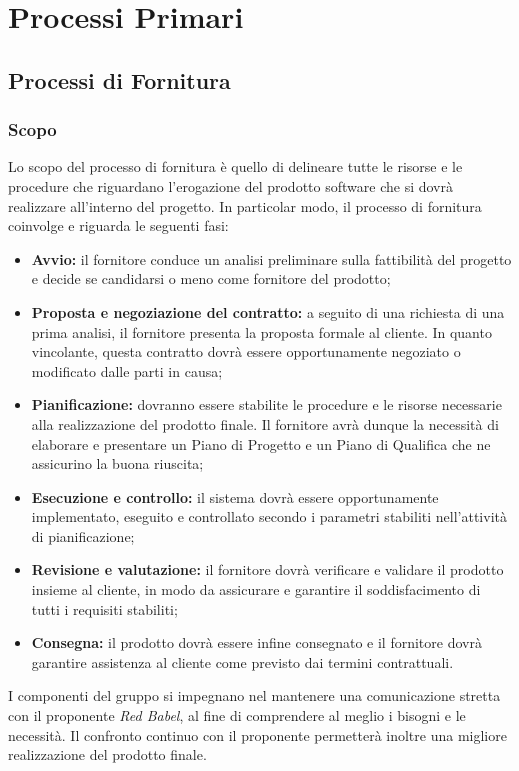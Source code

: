 \section{Processi Primari}
\subsection{Processi di Fornitura}
\subsubsection{Scopo}
Lo scopo del processo di fornitura è quello di delineare tutte le risorse e le procedure che riguardano l'erogazione del prodotto software che si dovrà realizzare all'interno del progetto. In particolar modo, il processo di fornitura coinvolge e riguarda le seguenti fasi:
\begin{itemize}
	\item \textbf{Avvio:} il fornitore conduce un analisi preliminare sulla fattibilità del progetto e decide se candidarsi o meno come fornitore del prodotto;
	\item \textbf{Proposta e negoziazione del contratto:} a seguito di una richiesta di una prima analisi, il fornitore presenta la proposta formale al cliente. In quanto vincolante, questa contratto dovrà essere opportunamente negoziato o modificato dalle parti in causa;
	\item \textbf{Pianificazione:} dovranno essere stabilite le procedure e le risorse necessarie alla realizzazione del prodotto finale. Il fornitore avrà dunque la necessità di elaborare e presentare un Piano di Progetto e un Piano di Qualifica che ne assicurino la buona riuscita;
	\item \textbf{Esecuzione e controllo:} il sistema dovrà essere opportunamente implementato, eseguito e controllato secondo i parametri stabiliti nell'attività di pianificazione;
	\item \textbf{Revisione e valutazione:} il fornitore dovrà verificare e validare il prodotto insieme al cliente, in modo da assicurare e garantire il soddisfacimento di tutti i requisiti stabiliti;
	\item \textbf{Consegna:} il prodotto dovrà essere infine consegnato e il fornitore dovrà garantire assistenza al cliente come previsto dai termini contrattuali.
\end{itemize} 
I componenti del gruppo si impegnano nel mantenere una comunicazione stretta con il proponente \textit{Red Babel}, al fine di comprendere al meglio i bisogni e le necessità. Il confronto continuo con il proponente permetterà inoltre una migliore realizzazione del prodotto finale.

